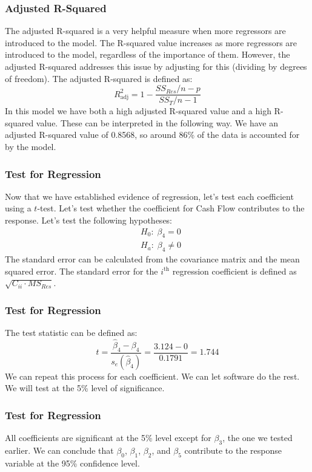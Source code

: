 \documentclass[12pt]{beamer}
\begin{document}
\begin{frame}
\frametitle{Adjusted R-Squared}
The adjusted R-squared is a very helpful measure when more regressors are introduced to the model. The R-squared value increases as more regressors are introduced to the model, regardless of the importance of them. However, the adjusted R-squared addresses this issue by adjusting for this (dividing by degrees of freedom). The adjusted R-squared is defined as: $$R_{\text{adj}}^2=1-\frac{SS_{Res}/n-p}{SS_T/n-1}$$ In this model we have both a high adjusted R-squared value and a high R-squared value. These can be interpreted in the following way. We have an adjusted R-squared value of 0.8568, so around 86\% of the data is accounted for by the model.
\end{frame}

\begin{frame}
\frametitle{Test for Regression}
Now that we have established evidence of regression, let's test each coefficient using a $t$-test. Let's test whether the coefficient for Cash Flow contributes to the response. Let's test the following hypotheses:
\begin{align*}
	&H_0:\; \beta_4=0\\
	&H_a:\; \beta_4\neq 0
\end{align*}
The standard error can be calculated from the covariance matrix and the mean squared error. The standard error for the $i^{\text{th}}$ regression coefficient is defined as $\sqrt{C_{ii}\cdot MS_{Res}}$.
\end{frame}

\begin{frame}
\frametitle{Test for Regression}
The test statistic can be defined as: $$t=\frac{\hat{\beta}_4-\beta_4}{s_e\left(\hat{\beta}_4\right)}=\frac{3.124-0}{0.1791}=1.744$$ We can repeat this process for each coefficient. We can let software do the rest. We will test at the 5\% level of significance.
{\scriptsize
\begin{mdframed}

\end{mdframed}}
\end{frame}

\begin{frame}
\frametitle{Test for Regression}
All coefficients are significant at the 5\% level except for $\beta_3$, the one we tested earlier. We can conclude that $\beta_0$, $\beta_1$, $\beta_2$, and $\beta_5$ contribute to the response variable at the 95\% confidence level.
\end{frame}
\end{document}
